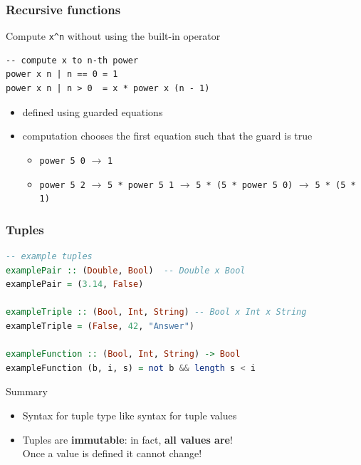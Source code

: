 \documentclass{beamer}
\begin{document}
\begin{frame}[fragile]
  \frametitle{Recursive functions}
  Compute \verb|x^n| without using the built-in operator
\begin{lstlisting}
-- compute x to n-th power
power x n | n == 0 = 1
power x n | n > 0  = x * power x (n - 1)
\end{lstlisting}
  \begin{itemize}
  \item defined using \alert{guarded equations}
  \item computation chooses the first equation such that the guard is
    true
    \begin{itemize}
    \item \lstinline|power 5 0| $\rightarrow$ \lstinline|1|
    \item \lstinline|power 5 2| $\rightarrow$
      \lstinline|5 * power 5 1| $\rightarrow$
      \lstinline|5 * (5 * power 5 0)| $\rightarrow$
      \lstinline|5 * (5 * 1)|
    \end{itemize}
  \end{itemize}
\end{frame}

\begin{frame}[fragile]
  \frametitle{Tuples}
  \begin{block}{}
\begin{lstlisting}[language=Haskell]
-- example tuples
examplePair :: (Double, Bool)  -- Double x Bool
examplePair = (3.14, False)

exampleTriple :: (Bool, Int, String) -- Bool x Int x String
exampleTriple = (False, 42, "Answer")

exampleFunction :: (Bool, Int, String) -> Bool
exampleFunction (b, i, s) = not b && length s < i
\end{lstlisting}
  \end{block}
  \begin{alertblock}{Summary}
    \begin{itemize}
    \item Syntax for tuple type like syntax for tuple values
    \item Tuples are \textbf{immutable}: in fact, \textbf{all values
        are}!\\
      Once a value is defined it cannot change! 
    \end{itemize}
  \end{alertblock}
\end{frame}
\end{document}
